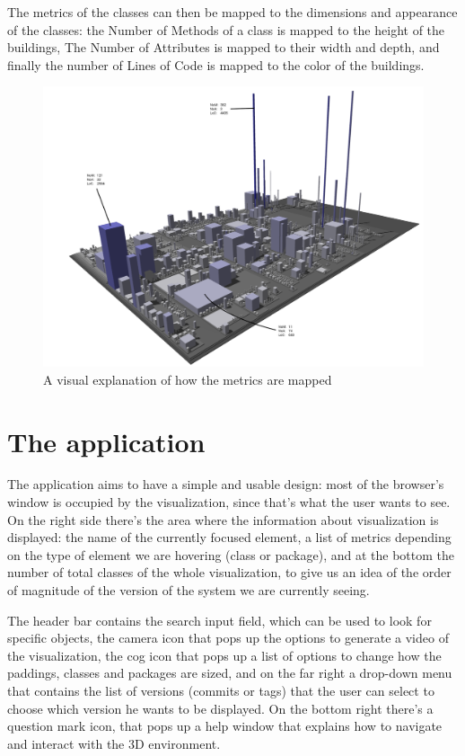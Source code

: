 \documentclass[]{usiinfbachelorproject}
\begin{document}
The metrics of the classes can then be mapped to the dimensions and appearance of the classes:
the Number of Methods of a class is mapped to the height of the buildings, The Number of Attributes is mapped to their width and depth, and finally the number of Lines of Code is mapped to the color of the buildings.

\begin{figure} [H]
\centering
\includegraphics[width=1\textwidth]{pictures/metrics.png}
\caption{A visual explanation of how the metrics are mapped}
\label{fig:metrics}
\end{figure}



\section{The application} \label{The application}

The application aims to have a simple and usable design: most of the browser's window is occupied by the visualization, since that's what the user wants to see. On the right side there's the area where the information about visualization is displayed: the name of the currently focused element, a list of metrics depending on the type of element we are hovering (class or package),
and at the bottom the number of total classes of the whole visualization, to give us an idea of the order of magnitude of the version of the system we are currently seeing.

The header bar contains the search input field, which can be used to look for specific objects, the camera icon that pops up the options to generate a video of the visualization, the cog icon that pops up a list of options to change how the paddings, classes and packages are sized, and on the far right a drop-down menu that contains the list of versions (commits or tags) that the user can select to choose which version he wants to be displayed.
On the bottom right there's a question mark icon, that pops up a help window that explains how to navigate and interact with the 3D environment.
\end{document}

